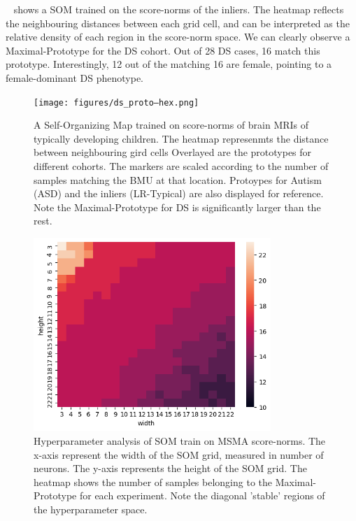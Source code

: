 ~ shows a SOM trained on the score-norms of the inliers. The heatmap reflects the neighbouring distances between each grid cell, and can be interpreted as the relative density of each region in the score-norm space.  We can clearly observe a Maximal-Prototype for the DS cohort. Out of 28 DS cases, 16 match this prototype. Interestingly, 12 out of the matching 16 are female, pointing to a female-dominant DS phenotype.

\begin{figure}[tbhp]
\centering
\texttt{[image: figures/ds\_proto–hex.png]}
\caption{A Self-Organizing Map trained on score-norms of brain MRIs of typically developing children. The heatmap represenmts the distance between neighbouring gird cells
Overlayed are the prototypes for different cohorts.
The markers are scaled according to the number of samples matching the BMU at that location. Protoypes for Autism (ASD) and the inliers (LR-Typical) are also displayed for reference. Note the Maximal-Prototype for DS is significantly larger than the rest. 
}
\label{fig:som-abcd}
\end{figure}

\begin{figure}[tbhp]
\centering
\includegraphics[width=0.8\textwidth]{figures/somhparams.png}
\caption{Hyperparameter analysis of SOM train on MSMA score-norms. The x-axis represent the width of the SOM grid, measured in number of neurons. The y-axis represents the height of the SOM grid. The heatmap shows the number of samples belonging to the Maximal-Prototype for each experiment. Note the diagonal 'stable' regions of the hyperparameter space.}
\label{fig:som-hparams}
\end{figure}

